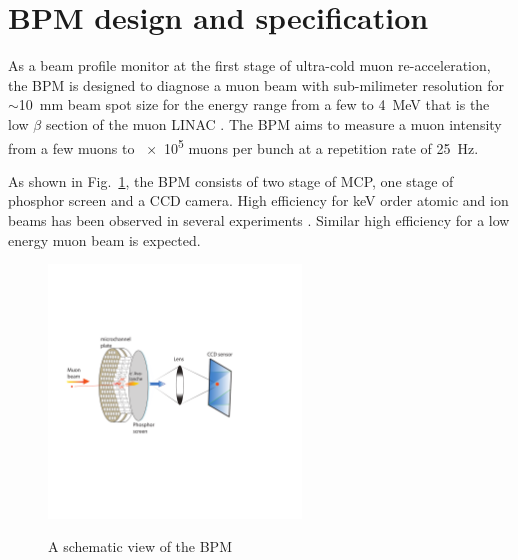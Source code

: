 \documentclass[preprint,3p,twocolumn]{elsarticle}
\begin{document}
\section{BPM design and specification}

As a beam profile monitor at the first stage of ultra-cold muon re-acceleration, the BPM is designed to diagnose a muon beam with %
sub-milimeter resolution for $\sim$\SI{10}{\mm} beam spot size for the energy range from a few to \SI{4}{\MeV} that is the low $\beta$ section of the muon LINAC \cite{IH}.
The BPM aims to measure a muon intensity from a few muons to \num{e5} muons per bunch at a repetition rate of \SI{25}{\hertz}. %

As shown in Fig.~\ref{fig:BPM_scheme}, the BPM consists of two stage of MCP, one stage of phosphor screen and a CCD camera.
High efficiency for \si{\keV} order atomic and ion beams has been observed in several experiments \cite{MCP_efficiency, MCP_efficiency1}. Similar high efficiency for a low energy muon beam is expected. 
\begin{figure}
\begin{center}
\vspace{-2.5cm}
\includegraphics[width=0.6\textwidth, height=0.6\textwidth]{figure/bpm_v3.pdf}
\vspace{-3cm}
\caption{A schematic view of the BPM
}
\vspace{-0.5cm}
\label{fig:BPM_scheme}
\end{center} \end{figure}
\end{document}
